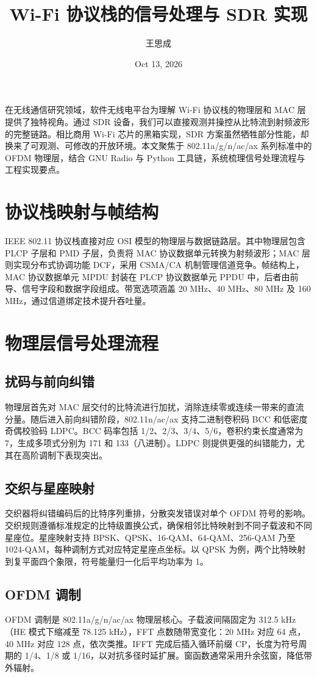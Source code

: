 \title{Wi-Fi 协议栈的信号处理与 SDR 实现}
\author{王思成}
\date{Oct 13, 2026}
\maketitle
在无线通信研究领域，软件无线电平台为理解 Wi-Fi 协议栈的物理层和 MAC 层提供了独特视角。通过 SDR 设备，我们可以直接观测并操控从比特流到射频波形的完整链路。相比商用 Wi-Fi 芯片的黑箱实现，SDR 方案虽然牺牲部分性能，却换来了可观测、可修改的开放环境。本文聚焦于 802.11a/g/n/ac/ax 系列标准中的 OFDM 物理层，结合 GNU Radio 与 Python 工具链，系统梳理信号处理流程与工程实现要点。\par
\chapter{协议栈映射与帧结构}
IEEE 802.11 协议栈直接对应 OSI 模型的物理层与数据链路层。其中物理层包含 PLCP 子层和 PMD 子层，负责将 MAC 协议数据单元转换为射频波形；MAC 层则实现分布式协调功能 DCF，采用 CSMA/CA 机制管理信道竞争。帧结构上，MAC 协议数据单元 MPDU 封装在 PLCP 协议数据单元 PPDU 中，后者由前导、信号字段和数据字段组成。带宽选项涵盖 20 MHz、40 MHz、80 MHz 及 160 MHz，通过信道绑定技术提升吞吐量。\par
\chapter{物理层信号处理流程}
\section{扰码与前向纠错}
物理层首先对 MAC 层交付的比特流进行加扰，消除连续零或连续一带来的直流分量。随后进入前向纠错阶段，802.11n/ac/ax 支持二进制卷积码 BCC 和低密度奇偶校验码 LDPC。BCC 码率包括 1/2、2/3、3/4、5/6，卷积约束长度通常为 7，生成多项式分别为 171 和 133（八进制）。LDPC 则提供更强的纠错能力，尤其在高阶调制下表现突出。\par
\section{交织与星座映射}
交织器将纠错编码后的比特序列重排，分散突发错误对单个 OFDM 符号的影响。交织规则遵循标准规定的比特级置换公式，确保相邻比特映射到不同子载波和不同星座位。星座映射支持 BPSK、QPSK、16-QAM、64-QAM、256-QAM 乃至 1024-QAM，每种调制方式对应特定星座点坐标。以 QPSK 为例，两个比特映射到复平面四个象限，符号能量归一化后平均功率为 1。\par
\section{OFDM 调制}
OFDM 调制是 802.11a/g/n/ac/ax 物理层核心。子载波间隔固定为 312.5 kHz（HE 模式下缩减至 78.125 kHz），FFT 点数随带宽变化：20 MHz 对应 64 点，40 MHz 对应 128 点，依次类推。IFFT 完成后插入循环前缀 CP，长度为符号周期的 1/4、1/8 或 1/16，以对抗多径时延扩展。窗函数通常采用升余弦窗，降低带外辐射。\par
